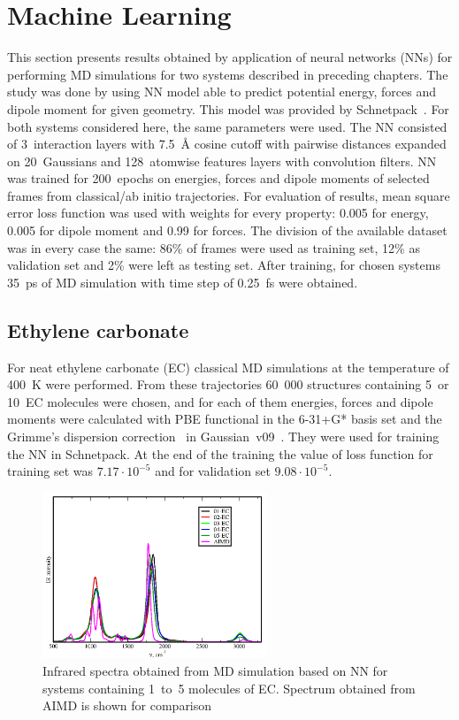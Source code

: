 \section{Machine Learning}

This section presents results obtained by application of neural networks (NNs) for performing MD simulations for two systems described in preceding chapters. The study was done by using NN model able to predict potential energy, forces and dipole moment for given geometry. This model was provided by Schnetpack~\cite{schnetpack}. For both systems considered here, the same parameters were used. The NN consisted of 3~interaction layers with 7.5~{\AA} cosine cutoff with pairwise distances expanded on 20~Gaussians and 128~atomwise features layers with convolution filters. NN was trained for 200~epochs on energies, forces and dipole moments of selected frames from classical/ab initio trajectories. For evaluation of results, mean square error loss function was used with weights for every property: 0.005 for energy, 0.005 for dipole moment and 0.99 for forces. The division of the available dataset was in every case the same: 86\% of frames were used as training set, 12\% as validation set and 2\% were left as testing set. After training, for chosen systems 35~ps of MD simulation with time step of 0.25~fs were obtained.

\subsection{Ethylene carbonate}

For neat ethylene carbonate (EC) classical MD simulations at the temperature of 400~K were performed. From these trajectories 60~000 structures containing 5~or 10~EC molecules were chosen, and for each of them energies, forces and dipole moments were calculated with PBE functional in the 6-31+G* basis set and the Grimme's dispersion correction~\cite{grimme-d3} in Gaussian~v09~\cite{gaussian}. They were used for training the NN in Schnetpack. At the end of the training the value of loss function for training set was $7.17\cdot 10^{-5}$ and for validation set $9.08\cdot 10^{-5}$.

\begin{figure}[ht]
    \centering
    \includegraphics[width=0.6\textwidth]{img/5-alternatives-to-aimd/3-ml/ec.png}
    \caption{Infrared spectra obtained from MD simulation based on NN for systems containing 1~to~5 molecules of EC. Spectrum obtained from AIMD is shown for comparison}
    \label{fig:ml-ec}
\end{figure}

